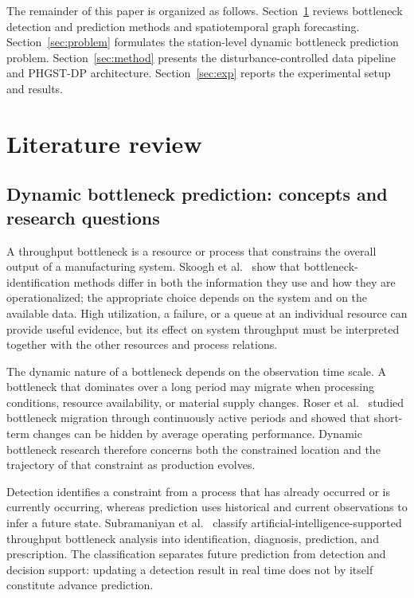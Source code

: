 \documentclass[a4paper,fleqn]{cas-dc}
\begin{document}
The remainder of this paper is organized as follows. Section~\ref{sec:review} reviews bottleneck detection and prediction methods and spatiotemporal graph forecasting. Section~\ref{sec:problem} formulates the station-level dynamic bottleneck prediction problem. Section~\ref{sec:method} presents the disturbance-controlled data pipeline and PHGST-DP architecture. Section~\ref{sec:exp} reports the experimental setup and results.


\section{Literature review} \label{sec:review}

\subsection{Dynamic bottleneck prediction: concepts and research questions}

A throughput bottleneck is a resource or process that constrains the overall output of a manufacturing system. Skoogh et al.~\cite{subramaniyan2023throughput} show that bottleneck-identification methods differ in both the information they use and how they are operationalized; the appropriate choice depends on the system and on the available data. High utilization, a failure, or a queue at an individual resource can provide useful evidence, but its effect on system throughput must be interpreted together with the other resources and process relations.


The dynamic nature of a bottleneck depends on the observation time scale. A bottleneck that dominates over a long period may migrate when processing conditions, resource availability, or material supply changes. Roser et al.~\cite{roser2002shifting} studied bottleneck migration through continuously active periods and showed that short-term changes can be hidden by average operating performance. Dynamic bottleneck research therefore concerns both the constrained location and the trajectory of that constraint as production evolves.


Detection identifies a constraint from a process that has already occurred or is currently occurring, whereas prediction uses historical and current observations to infer a future state. Subramaniyan et al.~\cite{subramaniyan2021ai} classify artificial-intelligence-supported throughput bottleneck analysis into identification, diagnosis, prediction, and prescription. The classification separates future prediction from detection and decision support: updating a detection result in real time does not by itself constitute advance prediction.
\end{document}
